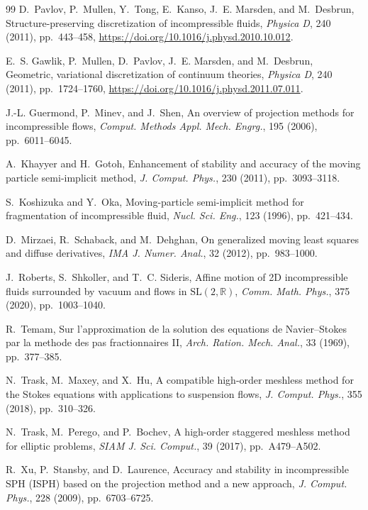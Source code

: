 \documentclass[11pt]{article}
\theoremstyle{plain}
\theoremstyle{definition}
\theoremstyle{remark}
\newcommand{\R}{\mathbb{R}}
\begin{document}
\begin{thebibliography}{99}
D.~Pavlov, P.~Mullen, Y.~Tong, E.~Kanso, J.~E. Marsden, and M.~Desbrun,
Structure-preserving discretization of incompressible fluids,
\emph{Physica D}, 240 (2011), pp.~443--458,
\url{https://doi.org/10.1016/j.physd.2010.10.012}.

E.~S. Gawlik, P.~Mullen, D.~Pavlov, J.~E. Marsden, and M.~Desbrun,
Geometric, variational discretization of continuum theories,
\emph{Physica D}, 240 (2011), pp.~1724--1760,
\url{https://doi.org/10.1016/j.physd.2011.07.011}.

J.-L. Guermond, P.~Minev, and J.~Shen,
An overview of projection methods for incompressible flows,
\emph{Comput. Methods Appl. Mech. Engrg.}, 195 (2006), pp.~6011--6045.

A.~Khayyer and H.~Gotoh,
Enhancement of stability and accuracy of the moving particle semi-implicit
method,
\emph{J. Comput. Phys.}, 230 (2011), pp.~3093--3118.

S.~Koshizuka and Y.~Oka,
Moving-particle semi-implicit method for fragmentation of incompressible
fluid,
\emph{Nucl. Sci. Eng.}, 123 (1996), pp.~421--434.

D.~Mirzaei, R.~Schaback, and M.~Dehghan,
On generalized moving least squares and diffuse derivatives,
\emph{IMA J. Numer. Anal.}, 32 (2012), pp.~983--1000.

J.~Roberts, S.~Shkoller, and T.~C. Sideris,
Affine motion of 2D incompressible fluids surrounded by vacuum and flows in
$\mathrm{SL}(2,\R)$,
\emph{Comm. Math. Phys.}, 375 (2020), pp.~1003--1040.

R.~Temam,
Sur l'approximation de la solution des equations de Navier--Stokes par la
methode des pas fractionnaires II,
\emph{Arch. Ration. Mech. Anal.}, 33 (1969), pp.~377--385.

N.~Trask, M.~Maxey, and X.~Hu,
A compatible high-order meshless method for the Stokes equations with
applications to suspension flows,
\emph{J. Comput. Phys.}, 355 (2018), pp.~310--326.

N.~Trask, M.~Perego, and P.~Bochev,
A high-order staggered meshless method for elliptic problems,
\emph{SIAM J. Sci. Comput.}, 39 (2017), pp.~A479--A502.

R.~Xu, P.~Stansby, and D.~Laurence,
Accuracy and stability in incompressible SPH (ISPH) based on the projection
method and a new approach,
\emph{J. Comput. Phys.}, 228 (2009), pp.~6703--6725.



\end{thebibliography}
\end{document}
